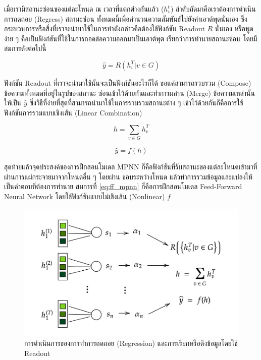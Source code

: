 เมื่อเรามีสถานะซ่อนของแต่ละโหนด ณ เวลาที่แตกต่างกันแล้ว ($h^{t}_{v}$) ลำดับถัดมาคือเราต้องการดำเนินการถดถอย (Regress) สถานะซ่อน%
ทั้งหมดนี้เพื่อคำนวนความสัมพันธ์ไปยังค่าเอาต์พุตนั่นเอง ซึ่งกระบวนการหรือสิ่งที่เราจะนำมาใช้ในการทำดังกล่าวคือต้องใช้ฟังก์ชัน Readout $R$ นั่นเอง
หรือพูดง่าย ๆ คือเป็นฟังก์ชันที่ใช้ในการถอดข้อความออกมาเป็นเอาต์พุต เรียกว่าการทำนายสถานะซ่อน โดยมีสมการดังต่อไปนี้

\begin{equation}
    \hat{y} = R({h^{T}_{v} | v \in G})
\end{equation}

\noindent ฟังก์ชัน Readout ที่เราจะนำมาใช้นั้นจะเป็นฟังก์ชันอะไรก็ได้ ขอแค่สามารถรวบรวม (Compose) ข้อความทั้งหมดที่อยู่ในรูปของสถานะ%
ซ่อนเข้าไว้ด้วยกันและทำการผสาน (Merge) ข้อความเหล่านั้นให้เป็น $\hat{y}$ ซึ่งวิธีที่ง่ายที่สุดที่สามารถนำมาใช้ในการรวมรวมสถานะต่าง ๆ 
เข้าไว้ด้วยกันก็คือการใช้ฟังก์ชันการรวมแบบเชิงเส้น (Linear Combination)

\begin{equation}
    h = \sum_{v \in G} h^{T}_{v}
\end{equation}

\begin{equation}\label{eq:ff_mpnn}
    \hat{y} = f(h)
\end{equation}

สุดท้ายแล้วจุดประสงค์ของการฝึกสอนโมเดล MPNN ก็คือฟังก์ชันที่รับสถานะของแต่ละโหนดเข้ามาที่ผ่านการแผ่กระจายมาจากโหนดอื่น ๆ โดยผ่าน%
ขอบระหว่างโหนด แล้วทำการรวมข้อมูลและแปลงให้เป็นคำตอบที่ต้องการทำนาย สมการที่ \ref{eq:ff_mpnn} ก็คือการฝึกสอนโมเดล 
Feed-Forward Neural Network โดยใช้ฟังก์ชันแบบไม่เชิงเส้น (Nonlinear) $f$

\begin{figure}[htbp]
    \centering
    \includegraphics[width=0.9\linewidth]{fig/mp-operation.png}
    \caption{การดำเนินการของการทำการถดถอย (Regression) และการเรียกหรือดึงข้อมูลโดยใช้ Readout}
    \label{fig:mp_operation}
\end{figure}

